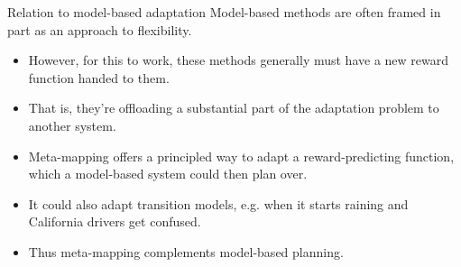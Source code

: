 \documentclass{beamer}
\begin{document}
\begin{frame}{Relation to model-based adaptation}
Model-based methods are often framed in part as an approach to flexibility.
\begin{itemize}
\item However, for this to work, these methods generally must have a new reward function handed to them.
\item That is, they're offloading a substantial part of the adaptation problem to another system.
\item Meta-mapping offers a principled way to adapt a reward-predicting function, which a model-based system could then plan over.
\item It could also adapt transition models, e.g. when it starts raining and California drivers get confused. 
\item Thus meta-mapping complements model-based planning.
\end{itemize}

\end{frame}
\end{document}
